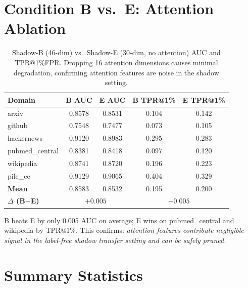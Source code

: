 \documentclass[11pt,a4paper]{article}
\begin{document}
\section{Condition B vs.\ E: Attention Ablation}

\begin{table}[ht]
\centering
\caption{Shadow-B (46-dim) vs.\ Shadow-E (30-dim, no attention) AUC and TPR@1\%FPR. Dropping 16 attention dimensions causes minimal degradation, confirming attention features are noise in the shadow setting.}
\label{tab:bvse}
\begin{tabular}{lcccc}
\toprule
\textbf{Domain} & \textbf{B AUC} & \textbf{E AUC} & \textbf{B TPR@1\%} & \textbf{E TPR@1\%} \\
\midrule
arxiv          & 0.8578 & 0.8531 & 0.104 & 0.142 \\
github         & 0.7548 & 0.7477 & 0.073 & 0.105 \\
hackernews     & 0.9120 & 0.8983 & 0.295 & 0.283 \\
pubmed\_central & 0.8381 & 0.8418 & 0.097 & 0.120 \\
wikipedia      & 0.8741 & 0.8720 & 0.196 & 0.223 \\
pile\_cc        & 0.9129 & 0.9065 & 0.404 & 0.329 \\
\midrule
\textbf{Mean}  & 0.8583 & 0.8532 & 0.195 & 0.200 \\
\textbf{$\Delta$ (B$-$E)} & \multicolumn{2}{c}{$+0.005$} & \multicolumn{2}{c}{$-0.005$} \\
\bottomrule
\end{tabular}
\end{table}

\noindent B beats E by only 0.005 AUC on average; E wins on pubmed\_central and wikipedia by TPR@1\%. This confirms: \textit{attention features contribute negligible signal in the label-free shadow transfer setting and can be safely pruned.}

\section{Summary Statistics}
\end{document}

